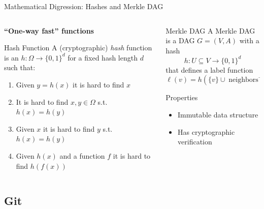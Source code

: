 \documentclass[xetex, handout]{beamer}
\begin{document}
\begin{frame}{Mathematical Digression: Hashes and Merkle DAG}
  \begin{columns}
    \begin{column}{.5\linewidth}
      \textbf{``One-way fast'' functions}
      \begin{block}{Hash Function}
        A (cryptographic) \emph{hash} function is an $h : \Omega \to \{0,1\}^d$
        for a fixed hash length $d$ such that:
        \begin{enumerate}
          \item Given $y = h(x)$ it is hard to find $x$
          \item It is hard to find $x,y \in \Omega$ s.t. $h(x) = h(y)$
          \item Given $x$ it is hard to find $y$ s.t. $h(x) = h(y)$
          \item Given $h(x)$ and a function $f$ it is hard to find $h(f(x))$
        \end{enumerate}
      \end{block}
    \end{column}
    \begin{column}{.5\linewidth}
      \begin{block}{Merkle DAG}
        A Merkle DAG is a DAG $G = (V,A)$ with a hash
        \[
          h : U \subseteq V \to \{0,1\}^d
        \]
        that defines a label function
        \[
          \ell(v) = h(\{v\} \cup \operatorname{neighbors}^+(v))
        \]
      \end{block}
      \begin{alertblock}{Properties}
        \begin{itemize}
          \item Immutable data structure
          \item Has cryptographic verification
        \end{itemize}
      \end{alertblock}
    \end{column}
  \end{columns}
\end{frame}

\subsection{Git}
\end{document}
